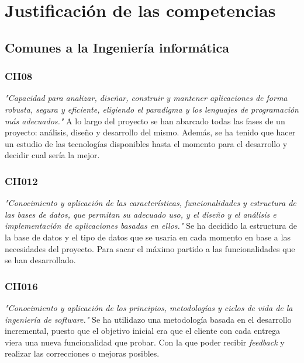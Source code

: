     \section{Justificación de las competencias}

    \subsection{Comunes a la Ingeniería informática}

    \subsubsection{CII08}
    \textit{"Capacidad para analizar, diseñar, construir y mantener aplicaciones de forma
    robusta, segura y eficiente, eligiendo el paradigma y los lenguajes de programación más
    adecuados."}
    \medskip
    A lo largo del proyecto se han abarcado todas las fases de un proyecto: análisis, diseño
    y desarrollo del mismo. Además, se ha tenido que hacer un estudio de las tecnologías
    disponibles hasta el momento para el desarrollo y decidir cual sería la mejor.

    \subsubsection{CII012}
    \textit{"Conocimiento y aplicación de las características, funcionalidades y estructura de las
    bases de datos, que permitan su adecuado uso, y el diseño y el análisis
    e implementación de aplicaciones basadas en ellos."}
    \medskip
    Se ha decidido la estructura de la base de datos y el tipo de datos que se usaria en cada
    momento en base a las necesidades del proyecto. Para sacar el máximo partido a las
    funcionalidades que se han desarrollado.

    \subsubsection{CII016}
    \textit{"Conocimiento y aplicación de los principios, metodologías y ciclos de vida de la
    ingeniería de software."}
    \medskip
    Se ha utilidazo una metodología basada en el desarrollo incremental, puesto que el objetivo
    inicial era que el cliente con cada entrega viera una nueva funcionalidad que probar. Con la
    que poder recibir \textit{feedback} y realizar las correcciones o mejoras posibles.


